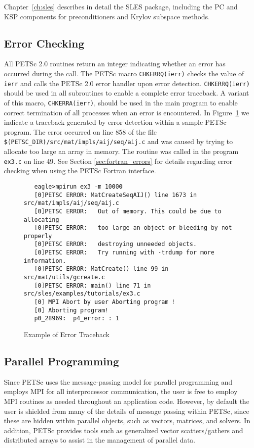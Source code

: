 Chapter~\ref{ch:sles} describes in detail the SLES package, including
the PC and KSP components for preconditioners and Krylov subspace methods.

\subsection*{Error Checking}

All PETSc 2.0 routines return an integer indicating whether an error
has occurred during the call.  The PETSc macro {\tt CHKERRQ(ierr)}
checks the value of {\tt ierr} and calls the PETSc 2.0 error handler
upon error detection.  {\tt CHKERRQ(ierr)} should be used in all
subroutines to enable a complete error traceback.  A variant of this
macro, {\tt CHKERRA(ierr)}, should be used in the main program to
enable correct termination of all processes when an error is
encountered.  In Figure~\ref{fig:traceback} we indicate a
traceback generated by error detection within a sample PETSc
program. The error occurred on line 858 of the file {\tt
\$(PETSC\_DIR)/src/mat/impls/aij/seq/aij.c} and was caused by trying to allocate too
large an array in memory. The routine was called in the program 
{\tt ex3.c} on line 49.  See Section \ref{sec:fortran_errors} for
details regarding error checking when using the PETSc Fortran interface.

\begin{figure}[H]
{\small
\begin{verbatim}
   eagle>mpirun ex3 -m 10000
   [0]PETSC ERROR: MatCreateSeqAIJ() line 1673 in src/mat/impls/aij/seq/aij.c
   [0]PETSC ERROR:   Out of memory. This could be due to allocating
   [0]PETSC ERROR:   too large an object or bleeding by not properly
   [0]PETSC ERROR:   destroying unneeded objects.
   [0]PETSC ERROR:   Try running with -trdump for more information. 
   [0]PETSC ERROR: MatCreate() line 99 in src/mat/utils/gcreate.c  
   [0]PETSC ERROR: main() line 71 in src/sles/examples/tutorials/ex3.c  
   [0] MPI Abort by user Aborting program !
   [0] Aborting program!
   p0_28969:  p4_error: : 1
\end{verbatim}
}
\nobreak
\caption{Example of Error Traceback}
\label{fig:traceback}
\end{figure}

\subsection*{Parallel Programming}

Since PETSc uses the message-passing model for
parallel programming and employs MPI for all interprocessor
communication, the user is free to employ MPI routines as needed
throughout an application code.  However, by default the user is
shielded from many of the details of message passing within PETSc,
since these are hidden within parallel objects, such as vectors,
matrices, and solvers.  In addition, PETSc provides tools such as
generalized vector scatters/gathers and distributed arrays to assist
in the management of parallel data.


